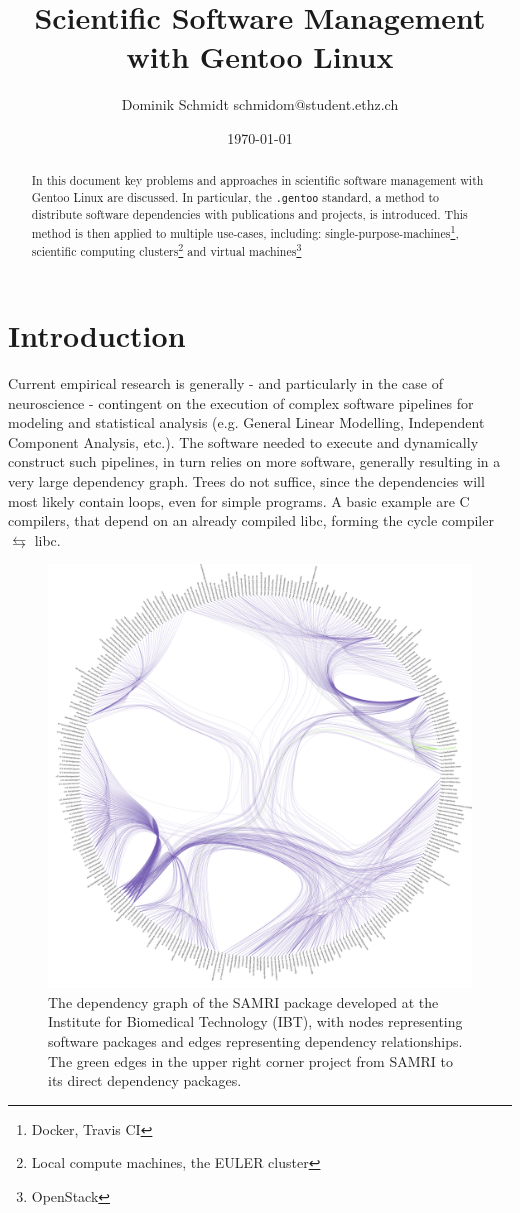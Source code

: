 \documentclass[11pt]{scrartcl}
\author{Dominik Schmidt \textsf{schmidom@student.ethz.ch}}
\title{Scientific Software Management with Gentoo Linux}
\date{\today}
\newcommand{\dg}[1]{\texttt{#1}}
\begin{document}
	\maketitle
	\begin{abstract}
		In this document key problems and approaches in scientific
		software management with Gentoo Linux are discussed.
		In particular, the \dg{.gentoo} standard, a method to distribute software dependencies with publications and projects, is introduced.
		This method is then applied to multiple use-cases, including:
		single-purpose-machines\footnote{Docker, Travis CI},
		scientific computing clusters\footnote{Local compute machines, the EULER cluster}
		and virtual machines\footnote{OpenStack}
	\end{abstract}
	\section{Introduction}
		Current empirical research is generally - and particularly in the case of neuroscience - contingent on the execution of complex software pipelines for modeling and statistical analysis (e.g. General Linear Modelling, Independent Component Analysis, etc.).
		The software needed to execute and dynamically construct such pipelines, in turn relies on more software, generally resulting in a very large dependency graph.
		Trees do not suffice, since the dependencies will most likely contain loops, even for simple programs. A basic example are C compilers, that depend on an already compiled libc, forming the cycle compiler $\leftrightarrows$ libc.

		\begin{figure}[H]
			\centering
			\includegraphics[width=0.75\linewidth]{graph/Real_Dependencygraph/RealDepgraph2.png}
			\caption{The dependency graph of the SAMRI package developed at the Institute for Biomedical Technology (IBT), with nodes representing software packages and edges representing dependency relationships.  The green edges in the upper right corner project from SAMRI to its direct dependency packages.}
		\end{figure}
		
\end{document}
